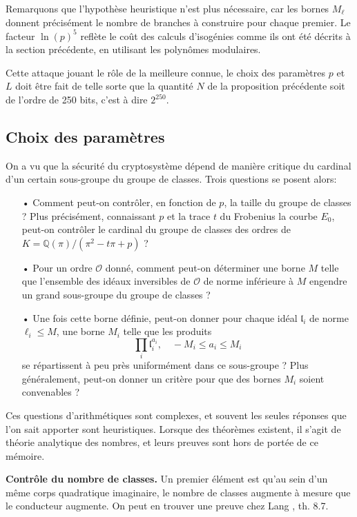 \documentclass[11pt,a4paper]{article}
\newcommand{\Q}{\mathbb{Q}}
\renewcommand{\O}{\mathcal{O}}
\renewcommand{\frak}{\mathfrak}
\renewcommand{\v}{\vspace{5mm}}
\theoremstyle{definition}
\begin{document}
Remarquons que l'hypothèse heuristique n'est plus nécessaire, car les bornes $M_\ell$ donnent précisément le nombre de branches à construire pour chaque premier. Le facteur $\ln(p)^5$ reflète le coût des calculs d'isogénies comme ils ont été décrits à la section précédente, en utilisant les polynômes modulaires.

\v
Cette attaque jouant le rôle de la meilleure connue, le choix des paramètres $p$ et $L$ doit être fait de telle sorte que la quantité $N$ de la proposition précédente soit de l'ordre de 250 bits, c'est à dire $2^{250}$. 



\subsection{Choix des paramètres}

On a vu que la sécurité du cryptosystème dépend de manière critique du cardinal d'un certain sous-groupe du groupe de classes. Trois questions se posent alors:
\begin{itemize}
\item[•] Comment peut-on contrôler, en fonction de $p$, la taille du groupe de classes ? Plus précisément, connaissant $p$ et la trace $t$ du Frobenius la courbe $E_0$, peut-on contrôler le cardinal du groupe de classes des ordres de $K = \Q(\pi)/(\pi^2 - t\pi + p)$ ?
\item[•] Pour un ordre $\O$ donné, comment peut-on déterminer une borne $M$ telle que l'ensemble des idéaux inversibles de $\O$ de norme inférieure à $M$ engendre un grand sous-groupe du groupe de classes ?
\item[•] Une fois cette borne définie, peut-on donner pour chaque idéal ${\frak l}_i$ de norme $\ell_i\leq M$, une borne $M_i$ telle que les produits
$$\prod_{i} {\frak l}_i^{a_i}, \quad - M_i\leq a_i\leq M_i$$
se répartissent à peu près uniformément dans ce sous-groupe ? Plus généralement, peut-on donner un critère pour que des bornes $M_i$ soient convenables ?
\end{itemize}

Ces questions d'arithmétiques sont complexes, et souvent les seules réponses que l'on sait apporter sont heuristiques. Lorsque des théorèmes existent, il s'agit de théorie analytique des nombres, et leurs preuves sont hors de portée de ce mémoire.
\v

\textbf{Contrôle du nombre de classes.} Un premier élément est qu'au sein d'un même corps quadratique imaginaire, le nombre de classes augmente à mesure que le conducteur augmente. On peut en trouver une preuve chez Lang \cite{Lang}, th. 8.7.
\end{document}
